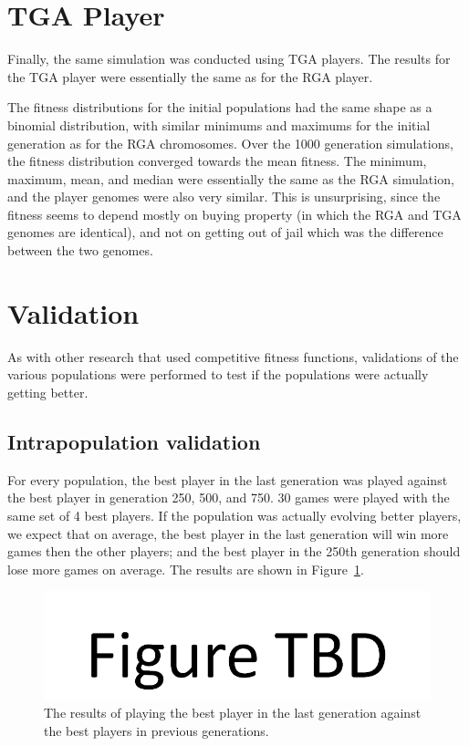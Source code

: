 \section{TGA Player}

Finally, the same simulation was conducted using TGA players. The results for
the TGA player were essentially the same as for the RGA player.

The fitness distributions for the initial populations had the same shape as a
binomial distribution, with similar minimums and maximums for the initial
generation as for the RGA chromosomes. Over the 1000 generation simulations, the
fitness distribution converged towards the mean fitness. The minimum, maximum,
mean, and median were essentially the same as the RGA simulation, and the player
genomes were also very similar. This is unsurprising, since the fitness seems to
depend mostly on buying property (in which the RGA and TGA genomes are
identical), and not on getting out of jail which was the difference between the
two genomes.

\section{Validation}

As with other research that used competitive fitness functions, validations of
the various populations were performed to test if the populations were actually
getting better.

\subsection{Intrapopulation validation}

For every population, the best player in the last generation was played against
the best player in generation 250, 500, and 750. 30 games were played with the
same set of 4 best players. If the population was actually evolving better
players, we expect that on average, the best player in the last generation will
win more games then the other players; and the best player in the 250th
generation should lose more games on average. The results are shown in
Figure~\ref{figure-intrapopulation}.

\begin{figure}[htp]
\centerline{\includegraphics[width=0.75\columnwidth]{Figures/figureTBD.png}}
\caption[Intrapopulation validation]{The results of playing the best player in
the last generation against the best players in previous generations.}
\label{figure-intrapopulation}
\end{figure}

